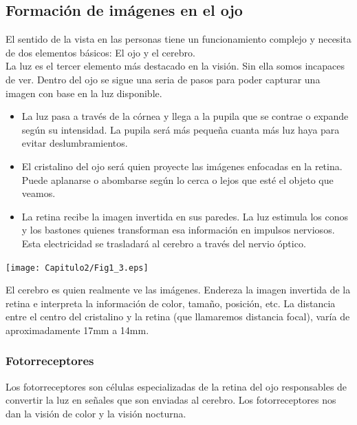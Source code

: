 \subsection{Formación de imágenes en el ojo}
El sentido de la vista en las personas tiene un funcionamiento complejo y
necesita de dos elementos básicos: El ojo y el cerebro.\\
La luz es el tercer elemento más destacado en la visión. Sin ella somos
incapaces de ver. Dentro del ojo se sigue una seria de pasos para poder capturar
una imagen con base en la luz disponible.
\begin{itemize}
    \item La luz pasa a través de la córnea y llega a la pupila que se contrae o
    expande según su intensidad. La pupila será más pequeña cuanta más luz haya para
    evitar deslumbramientos.
    \item El cristalino del ojo será quien proyecte las imágenes enfocadas en la retina.
    Puede aplanarse o abombarse según lo cerca o lejos que esté el objeto que veamos.
    \item La retina recibe la imagen invertida en sus paredes. La luz estimula los
    conos y los bastones quienes transforman esa información en impulsos nerviosos.
    Esta electricidad se trasladará al cerebro a través del nervio óptico.
\end{itemize}
\begin{center}
    \texttt{[image: Capitulo2/Fig1\_3.eps]}
    \label{Fig1_3}
\end{center}
El cerebro es quien realmente ve las imágenes. Endereza la imagen invertida de la
retina e interpreta la información de color, tamaño, posición, etc.
La distancia entre el centro del
cristalino y la retina (que llamaremos distancia focal), varía de
aproximadamente 17mm a 14mm.~\cite{joseramon2005}
\subsubsection{Fotorreceptores}
Los fotorreceptores son células especializadas de la retina del ojo responsables de
convertir la luz en señales que son enviadas al cerebro. Los fotorreceptores nos dan
la visión de color y la visión nocturna.
~\cite{americanacademyofophthalmology2017}

